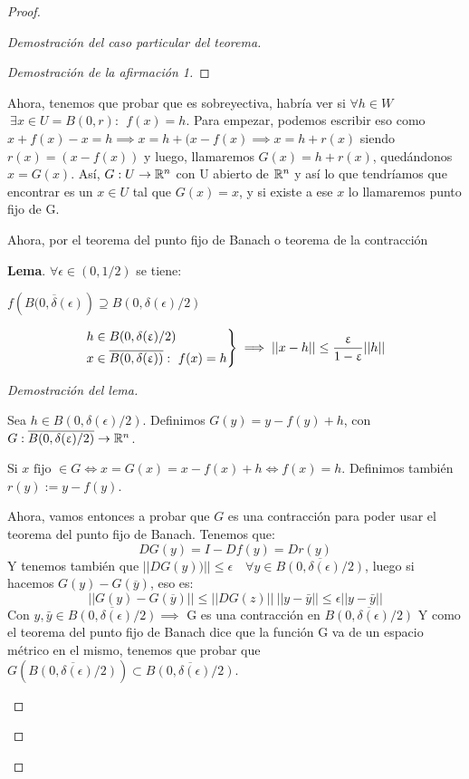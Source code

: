 \begin{proof}
\begin{proof}[Demostración del caso particular del teorema]
\begin{proof}[Demostración de la afirmación 1]
\end{proof} %
Ahora, tenemos que probar que es sobreyectiva, habría ver si $\forall h \in W$ $\ \exists x \in U =B(0,r) : \ \ f(x) = h$.
Para empezar, podemos escribir eso como $x+f(x)-x = h \implies x = h+(x-f(x) \implies x = h +r(x)$ siendo $r(x)=(x-f(x))$ y luego, llamaremos $G(x) = h+r(x)$, quedándonos $x=G(x)$. Así, $G: U \to \R^n$ con U abierto de $\R^n$ y así lo que tendríamos que encontrar es un $x\in U$ tal que $G(x) = x$, y si existe a ese $x$ lo llamaremos punto fijo de G.

Ahora, por el teorema del punto fijo de Banach o teorema de la contracción

\textbf{Lema}.
$\forall \epsilon \in (0,1/2)$ se tiene:
\begin{nlist}
	\item $f(\overline{B(0,\delta(\epsilon)}) \supseteq  B(0,\delta(\epsilon)/2)$
	\item \[\begin{rcases}
	h \in B(0, \delta(\epsilon)/2)\\
	x \in \overline{B(0, \delta(\epsilon))} :  \ f(x) = h
\end{rcases} \implies ||x-h|| \leq \frac{\epsilon}{1-\epsilon}||h||\]
\end{nlist}

\begin{proof}[Demostración del lema]
	\begin{nlist}
	\item Sea $h \in B(0, \delta(\epsilon)/2) $. Definimos $G(y) =  y-f(y) +h$, con $G: \overline{B(0, \delta(\epsilon)/2)} \to \R^n$.

	Si $x \text{ fijo } \in G \iff x = G(x) = x-f(x) +h \iff f(x) = h$. Definimos también $r(y):= y - f(y)$.

	Ahora, vamos entonces a probar que $G$ es una contracción para poder usar el teorema del punto fijo de Banach. Tenemos que:
	\[
	DG(y) = I - Df(y) = Dr(y)
	\]
	Y tenemos también que $||DG(y))|| \leq \epsilon \quad \forall y \in \overline{B(0, \delta(\epsilon)/2)}$, luego si hacemos $G(y) - G(\overline{y})$, eso es:
	\[
	||G(y) - G(\overline{y})|| \leq ||DG(z)||\ ||y-\bar{y}|| \leq \epsilon ||y-\bar{y}||
	\]
	Con $y,\bar{y} \in \overline{B(0, \delta(\epsilon)/2)} \implies  $ G es una contracción en $\overline{B(0, \delta(\epsilon)/2)}$
	Y como el teorema del punto fijo de Banach dice que la función G va de un espacio métrico en el mismo, tenemos que probar que $G(\overline{B(0, \delta(\epsilon)/2)}) \subset \overline{B(0, \delta(\epsilon)/2)}$.


\end{nlist}
\end{proof}
\end{proof}
\end{proof}
